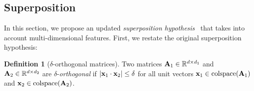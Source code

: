 \documentclass{article} %
\theoremstyle{plain}
\theoremstyle{definition}
\newtheorem{definition}{Definition}
\newtheorem{hypothesis}{Hypothesis}
\newcommand{\josh}[1]{{\color{orange}{\bf Josh:} #1}}
\begin{document}


\subsection{Superposition}

In this section, we propose an updated \textit{superposition hypothesis}~\citep{elhage2022superposition} that takes into account multi-dimensional features. First, we restate the original superposition hypothesis:
    


\begin{definition}[$\delta$-orthogonal matrices]
Two matrices ${\mathbf A}_1 \in \mathbb{R}^{d \times d_1}$ and ${\mathbf A}_2 \in \mathbb{R}^{d \times d_2}$
are $\delta$-{\it orthogonal} if
$|\mathbf{x}_1\cdot\mathbf{x}_2|\le \delta$ for all unit vectors $\mathbf{x}_1\in\text{colspace}({\mathbf A}_1)$ and 
$\mathbf{x}_2 \in \text{colspace}({\mathbf A}_2)$.

\end{definition}

\end{document}
